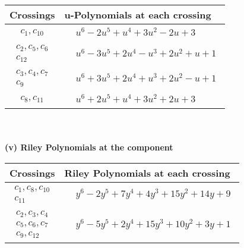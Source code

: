\documentclass[1p]{elsarticle_modified}
\theoremstyle{definition}
\begin{document}
\begin{tabular}{m{50pt}|m{274pt}}
Crossings & \hspace{64pt}u-Polynomials at each crossing \\
\hline $$\begin{aligned}c_{1},c_{10}\end{aligned}$$&$\begin{aligned}
&u^6-2 u^5+u^4+3 u^2-2 u+3
\end{aligned}$\\
\hline $$\begin{aligned}c_{2},c_{5},c_{6}\\c_{12}\end{aligned}$$&$\begin{aligned}
&u^6-3 u^5+2 u^4- u^3+2 u^2+u+1
\end{aligned}$\\
\hline $$\begin{aligned}c_{3},c_{4},c_{7}\\c_{9}\end{aligned}$$&$\begin{aligned}
&u^6+3 u^5+2 u^4+u^3+2 u^2- u+1
\end{aligned}$\\
\hline $$\begin{aligned}c_{8},c_{11}\end{aligned}$$&$\begin{aligned}
&u^6+2 u^5+u^4+3 u^2+2 u+3
\end{aligned}$\\
\hline
\end{tabular}\\~\\
\newpage\renewcommand{\arraystretch}{1}
\flushleft \textbf{(v) Riley Polynomials at the component}\newline \\
\begin{tabular}{m{50pt}|m{274pt}}
Crossings & \hspace{64pt}Riley Polynomials at each crossing \\
\hline $$\begin{aligned}c_{1},c_{8},c_{10}\\c_{11}\end{aligned}$$&$\begin{aligned}
&y^6-2 y^5+7 y^4+4 y^3+15 y^2+14 y+9
\end{aligned}$\\
\hline $$\begin{aligned}c_{2},c_{3},c_{4}\\c_{5},c_{6},c_{7}\\c_{9},c_{12}\end{aligned}$$&$\begin{aligned}
&y^6-5 y^5+2 y^4+15 y^3+10 y^2+3 y+1
\end{aligned}$\\
\hline
\end{tabular}\\~\\
\end{document}
